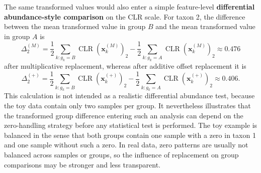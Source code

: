 The same transformed values would also enter a simple feature-level \textbf{differential abundance-style comparison} on the CLR scale. For taxon 2, the difference between the mean transformed value in group $B$ and the mean transformed value in group $A$ is
\begin{equation}
\Delta_2^{(M)}
=
\frac{1}{2}\sum_{k:g_k=B}\operatorname{CLR}(\mathbf{x}_k^{(M)})_2
-
\frac{1}{2}\sum_{k:g_k=A}\operatorname{CLR}(\mathbf{x}_k^{(M)})_2
\approx 0.476
\label{eq:2micro:mult_replacement_da_contrast_example}
\end{equation}
after multiplicative replacement, whereas after additive offset replacement it is
\begin{equation}
\Delta_2^{(+)}
=
\frac{1}{2}\sum_{k:g_k=B}\operatorname{CLR}(\mathbf{x}_k^{(+)})_2
-
\frac{1}{2}\sum_{k:g_k=A}\operatorname{CLR}(\mathbf{x}_k^{(+)})_2
\approx 0.406.
\label{eq:2micro:additive_offset_da_contrast_example}
\end{equation}
This calculation is not intended as a realistic differential abundance test, because the toy data contain only two samples per group. It nevertheless illustrates that the transformed group difference entering such an analysis can depend on the zero-handling strategy before any statistical test is performed. The toy example is balanced in the sense that both groups contain one sample with a zero in taxon 1 and one sample without such a zero. In real data, zero patterns are usually not balanced across samples or groups, so the influence of replacement on group comparisons may be stronger and less transparent.

